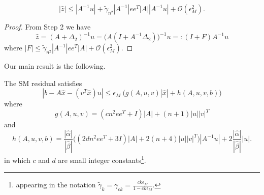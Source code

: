 \documentclass{siamltex}
\newcommand{\eps}{\epsilon}
\begin{document}
\begin{lemma}
\begin{equation} \label{zHatBnd:eq}
|\hat z| \leq |A^{-1} u| + \tilde \gamma_{n^2} |A^{-1}| e e^T |A| |A^{-1} u| +  \mathcal{O}(\eps_M^2).
\end{equation}
\end{lemma}
\begin{proof}
From Step 2 we have
\[
\hat z = (A+\Delta_2)^{-1} u =  \big(A (I+ A^{-1}\Delta_2) \big)^{-1} u =: (I+ F) A^{-1} u 
\] 
where $|F| \leq \tilde \gamma_{n^2} |A^{-1}| e e^T |A| + \mathcal{O}(\eps_M^2)$.
\end{proof}

Our main result is the following.
\begin{theorem} \label{SM_resBndCmp:thm}
The SM residual satisfies 
\begin{equation} \label{SM_resBndCmp:eq}
|b - A\hat x - (v^T \hat x) u| \leq \eps_M \ \big( g(A,u,v) |\hat x| + h(A, u, v, b) \big)
\end{equation}
 where 
\[
g(A,u,v) = (c n^2 e e^T + I) |A| + (n+1) |u| |v|^T
\]
and
\begin{equation} \label{h_formula:eq}
h(A,u,v, b) = \frac{|\hat \alpha|}{|\hat \beta|} \Big( (2d n^2 e e^T + 3I) |A| + 2 (n+4) |u| |v|^T\Big) |A^{-1} u| + 2 \frac{|\hat \alpha|}{|\hat \beta|} |u|.
\end{equation}
in which $c$ and $d$ are small integer constants\footnote{appearing in the notation $\tilde \gamma_{k} = \gamma_{ck}  = \frac{c k \eps_M}{1 - c k \eps_M}$.}.
\end{theorem}
\end{document}

